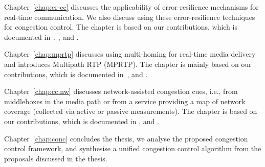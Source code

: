 Chapter~\ref{chap:er-cc} discusses the applicability of error-resilience
mechanisms for real-time communication. We also discuss using these
error-resilience techniques for congestion control. The chapter is based on
our contributions, which is documented in~\cite{draft.adaptive.fec, draft.1d2d.fec},
, and .


Chapter~\ref{chap:mprtp} discusses using multi-homing for real-time media
delivery and introduces Multipath RTP (MPRTP). The chapter is mainly based on
our contributions, which is documented in~\cite{draft.mprtp, draft.mprtp.sdp,
Globisch:AsymGrpComm, draft.rtcp.overlay}, and .



Chapter~\ref{chap:cc.nw} discusses network-assisted congestion cues, i.e.,
from middleboxes in the media path or from a service providing a map of
network coverage (collected via active or passive measurements). The chapter
is based on our contributions, which is documented in ,
 and \cite{glass:patent}.


Chapter~\ref{chap:conc} concludes the thesis, we analyse the proposed
congestion control framework, and synthesise a unified congestion control
algorithm from the proposals discussed in the thesis.
